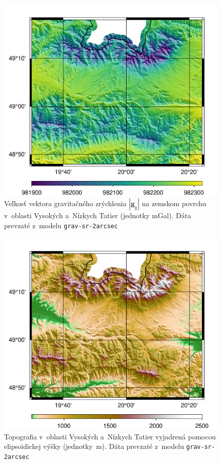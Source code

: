 \documentclass[a4paper, 12pt]{book}
\newcommand{\gidx}{\mathrm g}
\let\vec\mathbf
\begin{document}
\begin{figure}
\centering
\includegraphics{./fig-gg-grav-sr-2arcsec.pdf}
\caption{Veľkosť vektora gravitačného zrýchlenia $| \vec g_\gidx |$ na zemskom 
povrchu v~oblasti Vysokých a~Nízkych Tatier (jednotky mGal).  Dáta prevzaté 
z~modelu \texttt{grav-sr-2arcsec} \citep{GravSR2arcsec}}
\label{fig:gg_grav_sr_2arcsec}
\end{figure}

\begin{figure}
\centering
\includegraphics{./fig-h-grav-sr-2arcsec.pdf}
\caption{Topografia v~oblasti Vysokých a~Nízkych Tatier vyjadrená pomocou 
elipsoidickej výšky (jednotky~m).  Dáta prevzaté z~modelu 
\texttt{grav-sr-2arcsec} \citep{GravSR2arcsec}}
\label{fig:h_grav_sr_2arcsec}
\end{figure}
\end{document}
